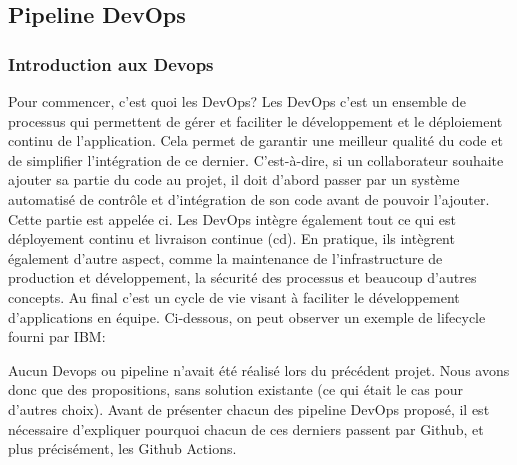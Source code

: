 \documentclass[
    iai, %
    il, %
]{heig-tb}
\begin{document}
\clearpage
\subsection{Pipeline DevOps}
\subsubsection{Introduction aux Devops}
Pour commencer, c'est quoi les DevOps?
Les DevOps c'est un ensemble de processus qui permettent de gérer et faciliter le développement et le déploiement continu de l'application. Cela permet de garantir une meilleur qualité du code et de simplifier l'intégration de ce dernier. C'est-à-dire, si un collaborateur souhaite ajouter sa partie du code au projet, il doit d'abord passer par un système automatisé de contrôle et d'intégration de son code avant de pouvoir l'ajouter. Cette partie est appelée \Gls{ci}.
Les DevOps intègre également tout ce qui est déployement continu et livraison continue (\Gls{cd}).
En pratique, ils intègrent également d'autre aspect, comme la maintenance de l'infrastructure de production et développement, la sécurité des processus et beaucoup d'autres concepts.
Au final c'est un cycle de vie visant à faciliter le développement d'applications en équipe.
Ci-dessous, on peut observer un exemple de lifecycle fourni par IBM:


Aucun Devops ou pipeline n'avait été réalisé lors du précédent projet.
Nous avons donc que des propositions, sans solution existante (ce qui était le cas pour d'autres choix).
Avant de présenter chacun des pipeline DevOps proposé, il est nécessaire d'expliquer pourquoi chacun de ces derniers passent par Github, et plus précisément, les Github Actions.
\end{document}
